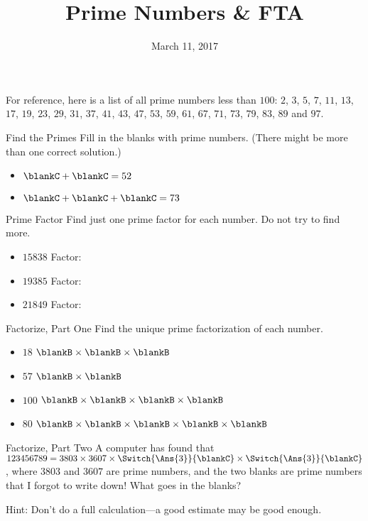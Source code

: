 \documentclass[12pt,letterpaper]{article}
\title{Prime Numbers \& FTA}
\date{March 11, 2017}
\begin{document}
\maketitle

\thispagestyle{empty}

For reference, here is a list of all prime numbers less than $100$: $2$, $3$,
$5$, $7$, $11$, $13$, $17$, $19$, $23$, $29$, $31$, $37$, $41$, $43$, $47$,
$53$, $59$, $61$, $67$, $71$, $73$, $79$, $83$, $89$ and $97$.

\begin{problem}{Find the Primes}
 Fill in the blanks with prime numbers. (There might be more than one correct
 solution.)

 \begin{itemize}
  \item $\blankC + \blankC = 52$
  \item $\blankC + \blankC + \blankC = 73$
 \end{itemize}
\end{problem}

\begin{problem}{Prime Factor}
 Find just one prime factor for each number. Do not try to find more.

 \begin{itemize}
  \item $15838$ \hfill Factor: \blankB
  \item $19385$ \hfill Factor: \blankB
  \item $21849$ \hfill Factor: \blankB
 \end{itemize}
\end{problem}

\begin{problem}{Factorize, Part One}
 Find the unique prime factorization of each number.

 \begin{itemize}
  \item $18$ \hfill $\blankB \times \blankB \times \blankB$
  \item $57$ \hfill $\blankB \times \blankB$
  \item $100$ \hfill $\blankB \times \blankB \times \blankB \times \blankB$
  \item $80$ \hfill $\blankB \times \blankB \times \blankB \times \blankB
  \times \blankB$
 \end{itemize}
\end{problem}

\begin{problem}{Factorize, Part Two}
  A computer has found that \(123456789 = 3803 \times 3607 \times
  \Switch{\Ans{3}}{\blankC} \times \Switch{\Ans{3}}{\blankC}\), where \(3803\)
  and \(3607\) are prime numbers, and the two blanks are prime numbers that I
  forgot to write down! What goes in the blanks?

  Hint: Don't do a full calculation---a good estimate may be good enough.
\end{problem}
\end{document}
